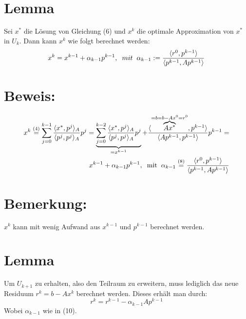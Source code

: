 \documentclass{article}
\begin{document}
\section{Lemma}
Sei $x^{*}$ die Lösung von Gleichung (6) und $x^{k}$ die optimale Approximation von $x^{*}$ in $U_{k}$. Dann kann $x^{k}$ wie folgt berechnet werden:
\begin{equation}
x^{k} = x^{k-1} + \alpha_{k-1}p^{k-1}, \hspace{2mm} mit \hspace{2mm} \alpha_{k-1} := \frac {\langle r^{0}, p^{k-1} \rangle} {\langle {p^{k-1}, Ap^{k-1}} \rangle}
\end{equation}

\section{Beweis:}
\begin{align*}
\begin{split}
x^{k} \overset{(4)}{=}
\sum_{j=0}^{k-1} \frac {\langle x^{*}, p^{j} \rangle _{A}} {\langle {p^{j}, p^{j}} \rangle _{A}} p^{j} =
\underbrace{\sum_{j=0}^{k-2} \frac {\langle x^{*}, p^{j} \rangle _{A}} {\langle {p^{j}, p^{j}} \rangle _{A}} p^{j}}_{=x^{k-1}} +
\frac {\langle \overbrace{Ax^{*}}^{=b=b-Ax^{0}=r^{0}}, p^{k-1} \rangle} {\langle {Ap^{k-1}, p^{k-1}} \rangle} p^{k-1} =\\
x^{k-1} + \alpha_{k-1}p^{k-1}, \hspace{2mm} \textnormal{mit} \hspace{2mm} \alpha_{k-1} \overset{(8)}{=} \frac {\langle r^{0}, p^{k-1} \rangle} {\langle {p^{k-1}, Ap^{k-1}} \rangle}
\end{split}
\end{align*}

\section{Bemerkung:}
$x^{k}$ kann mit wenig Aufwand aus $x^{k-1}$ und $p^{k-1}$ berechnet werden.

\section{Lemma}
Um $U_{k+1}$ zu erhalten, also den Teilraum zu erweitern, muss lediglich das neue Residuum $r^{k} = b - Ax^{k}$ berechnet werden. Dieses erhält man durch:
\begin{equation}
r^{k} = r^{k-1} - \alpha_{k-1}Ap^{k-1}
\end{equation}
Wobei $\alpha_{k-1}$ wie in (10).
\end{document}
